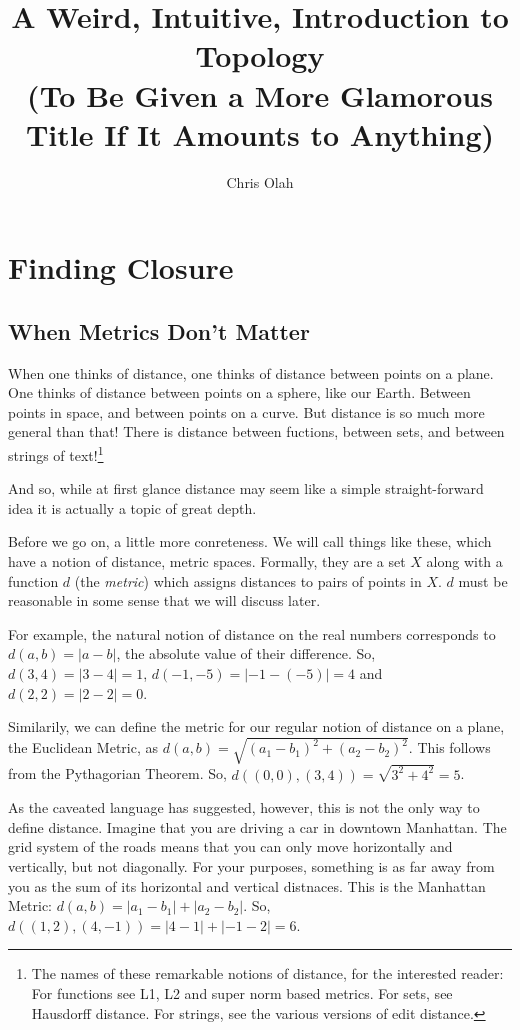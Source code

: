 \documentclass{report}
\begin{document}
\title{A Weird, Intuitive, Introduction to Topology\\{\small(To Be Given a More Glamorous Title If It Amounts to Anything)}}
\author{Chris Olah}

\maketitle

\chapter{Finding Closure}

\section{When Metrics Don't Matter}

When one thinks of distance, one thinks of distance between points on a plane. One thinks of distance between points on a sphere, like our Earth. Between points in space, and between points on a curve. But distance is so much more general than that! There is distance between fuctions, between sets, and between strings of text!\footnote{The names of these remarkable notions of distance, for the interested reader: For functions see L1, L2 and super norm based metrics. For sets, see Hausdorff distance. For strings, see the various versions of edit distance.}

And so, while at first glance distance may seem like a simple straight-forward idea it is actually a topic of great depth.

Before we go on, a little more conreteness. We will call things like these, which have a notion of distance, metric spaces. Formally, they are a set $X$ along with a function $d$ (the \emph{metric}) which assigns distances to pairs of points in $X$. $d$ must be reasonable in some sense that we will discuss later.

For example, the natural notion of distance on the real numbers corresponds to $d(a,b) = |a-b|$, the absolute value of their difference. So, $d(3,4) = |3-4| = 1$, $d(-1, -5) = |-1-(-5)| = 4$ and $d(2,2) = |2-2| = 0$.

Similarily, we can define the metric for our regular notion of distance on a plane, the Euclidean Metric, as $d(a,b) = \sqrt{(a_1-b_1)^2 + (a_2-b_2)^2}$. This follows from the Pythagorian Theorem. So, $d((0,0), (3,4)) = \sqrt{3^2+4^2} = 5$.

As the caveated language has suggested, however, this is not the only way to define distance. Imagine that you are driving a car in downtown Manhattan. The grid system of the roads means that you can only move horizontally and vertically, but not diagonally. For your purposes, something is as far away from you as the sum of its horizontal and vertical distnaces. This is the Manhattan Metric: $d(a,b) = |a_1-b_1| + |a_2-b_2|$. So, $d((1,2), (4, -1)) = |4-1| + |-1 -2| = 6$.
\end{document}
